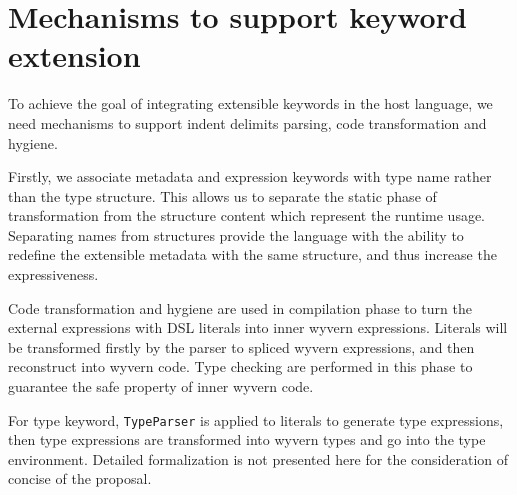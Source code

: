 \documentclass[letterpaper, notitlepage]{article}
\begin{document}
\section{Mechanisms to support keyword extension}
To achieve the goal of integrating extensible keywords in the host language, we need mechanisms to support indent delimits parsing, code transformation and hygiene.
\par
Firstly, we associate metadata and expression keywords with type name rather than the type structure. This allows us to separate the static phase of transformation from the structure content which represent the runtime usage. Separating names from structures provide the language with the ability to redefine the extensible metadata with the same structure, and thus increase the expressiveness.
\par
Code transformation and hygiene are used in compilation phase to turn the external expressions with DSL literals into inner wyvern expressions. Literals will be transformed firstly by the parser to spliced wyvern expressions, and then reconstruct into wyvern code. Type checking are performed in this phase to guarantee the safe property of inner wyvern code.
\par
For type keyword, \texttt{TypeParser} is applied to literals to generate type expressions, then type expressions are transformed into wyvern types and go into the type environment. Detailed formalization is not presented here for the consideration of concise of the proposal.
\end{document}
